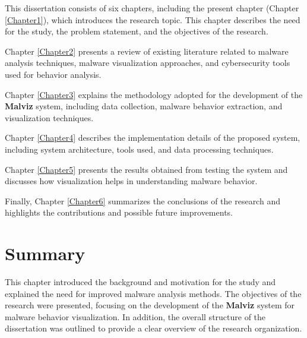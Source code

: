 This dissertation consists of six chapters, including the present chapter (Chapter \ref{Chapter1}), which introduces the research topic. 
This chapter describes the need for the study, the problem statement, and the objectives of the research. 

Chapter \ref{Chapter2} presents a review of existing literature related to malware analysis techniques, malware visualization approaches, and cybersecurity tools used for behavior analysis. 

Chapter \ref{Chapter3} explains the methodology adopted for the development of the \textbf{Malviz} system, including data collection, malware behavior extraction, and visualization techniques. 

Chapter \ref{Chapter4} describes the implementation details of the proposed system, including system architecture, tools used, and data processing techniques. 

Chapter \ref{Chapter5} presents the results obtained from testing the system and discusses how visualization helps in understanding malware behavior. 

Finally, Chapter \ref{Chapter6} summarizes the conclusions of the research and highlights the contributions and possible future improvements.


\section{Summary}

This chapter introduced the background and motivation for the study and explained the need for improved malware analysis methods. 
The objectives of the research were presented, focusing on the development of the \textbf{Malviz} system for malware behavior visualization. 
In addition, the overall structure of the dissertation was outlined to provide a clear overview of the research organization.
 